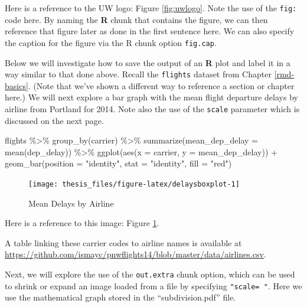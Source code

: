 \documentclass[print]{nuthesis}
\newenvironment{Shaded}{\begin{snugshade}}{\end{snugshade}}
\newcommand{\AttributeTok}[1]{\textcolor[rgb]{0.77,0.63,0.00}{#1}}
\newcommand{\FunctionTok}[1]{\textcolor[rgb]{0.00,0.00,0.00}{#1}}
\newcommand{\NormalTok}[1]{#1}
\newcommand{\SpecialCharTok}[1]{\textcolor[rgb]{0.00,0.00,0.00}{#1}}
\newcommand{\StringTok}[1]{\textcolor[rgb]{0.31,0.60,0.02}{#1}}
\begin{document}
Here is a reference to the UW logo: Figure \ref{fig:uwlogo}. Note the use of the \texttt{fig:} code here. By naming the \textbf{R} chunk that contains the figure, we can then reference that figure later as done in the first sentence here. We can also specify the caption for the figure via the R chunk option \texttt{fig.cap}.

\clearpage

Below we will investigate how to save the output of an \textbf{R} plot and label it in a way similar to that done above. Recall the \texttt{flights} dataset from Chapter \ref{rmd-basics}. (Note that we've shown a different way to reference a section or chapter here.) We will next explore a bar graph with the mean flight departure delays by airline from Portland for 2014. Note also the use of the \texttt{scale} parameter which is discussed on the next page.

\begin{Shaded}
\begin{Highlighting}[]
\NormalTok{flights }\SpecialCharTok{\%\textgreater{}\%}
    \FunctionTok{group\_by}\NormalTok{(carrier) }\SpecialCharTok{\%\textgreater{}\%}
    \FunctionTok{summarize}\NormalTok{(}\AttributeTok{mean\_dep\_delay =} \FunctionTok{mean}\NormalTok{(dep\_delay)) }\SpecialCharTok{\%\textgreater{}\%}
    \FunctionTok{ggplot}\NormalTok{(}\FunctionTok{aes}\NormalTok{(}\AttributeTok{x =}\NormalTok{ carrier, }\AttributeTok{y =}\NormalTok{ mean\_dep\_delay)) }\SpecialCharTok{+}
    \FunctionTok{geom\_bar}\NormalTok{(}\AttributeTok{position =} \StringTok{"identity"}\NormalTok{, }\AttributeTok{stat =} \StringTok{"identity"}\NormalTok{,}
        \AttributeTok{fill =} \StringTok{"red"}\NormalTok{)}
\end{Highlighting}
\end{Shaded}

\begin{figure}
\texttt{[image: thesis\_files/figure-latex/delaysboxplot-1]} \caption{Mean Delays by Airline}\label{fig:delaysboxplot}
\end{figure}

Here is a reference to this image: Figure \ref{fig:delaysboxplot}.

A table linking these carrier codes to airline names is available at \url{https://github.com/ismayc/pnwflights14/blob/master/data/airlines.csv}.

\clearpage

Next, we will explore the use of the \texttt{out.extra} chunk option, which can be used to shrink or expand an image loaded from a file by specifying \texttt{"scale=\ "}. Here we use the mathematical graph stored in the ``subdivision.pdf'' file.
\end{document}
